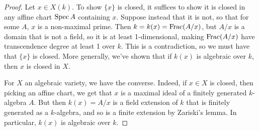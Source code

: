 \begin{proof}
	Let $x \in X(k)$. To show $\{x\}$ is closed, it suffices to show it is closed in any affine chart $\operatorname{Spec} A$ containing $x$. Suppose instead that it is not, so that for some $A$, $x$ is a non-maximal prime. Then $k = k(x) = \operatorname{Frac}(A/x)$, but $A/x$ is a domain that is not a field, so it is at least 1-dimensional, making $\operatorname{Frac}(A/x)$ have transcendence degree at least 1 over $k$. This is a contradiction, so we must have that $\{x\}$ is closed. More generally, we've shown that if $k(x)$ is algebraic over $k$, then $x$ is closed in $X$.
	
	For $X$ an algebraic variety, we have the converse. Indeed, if $x \in X$ is closed, then picking an affine chart, we get that $x$ is a maximal ideal of a finitely generated $k$-algebra $A$. But then $k(x) = A/x$ is a field extension of $k$ that is finitely generated as a $k$-algebra, and so is a finite extension by Zariski's lemma. In particular, $k(x)$ is algebraic over $k$.
\end{proof}
